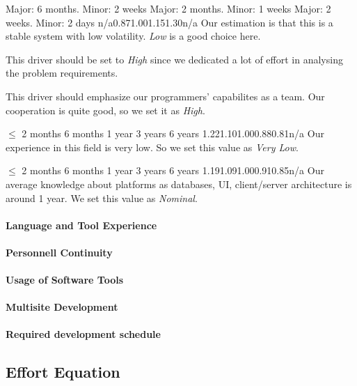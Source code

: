 { Major: 6 months. Minor: 2 weeks } { Major: 2 months. Minor: 1 weeks }
{ Major: 2 weeks. Minor: 2 days } { }
{n/a}{0.87}{1.00}{1.15}{1.30}{n/a} {
    Our estimation is that this is a stable system with low volatility.
    \emph{Low} is a good choice here.
}

 {
    This driver should be set to \emph{High} since we dedicated a lot of
    effort in analysing the problem requirements.
}

 {
    This driver should emphasize our programmers' capabilites as a team. 
    Our cooperation is quite good, so we set it as \emph{High}.
}

{ $ \leq $ 2 months } { 6 months } {1 year } {3 years} {6 years} { }
{1.22}{1.10}{1.00}{0.88}{0.81}{n/a} { 
    Our experience in this field is very low. So we set this value as \emph {Very Low}.
}

{ $ \leq $ 2 months } { 6 months } {1 year } {3 years} {6 years} { }
{1.19}{1.09}{1.00}{0.91}{0.85}{n/a} { 
    Our average knowledge about platforms as databases, UI, client/server architecture
    is around 1 year. We set this value as \emph{Nominal}.
}

\paragraph{Language and Tool Experience}
\paragraph{Personnell Continuity}
\paragraph{Usage of Software Tools}
\paragraph{Multisite Development}
\paragraph{Required development schedule}

\subsection{Effort Equation} %
\label{sub:effort_equation}
